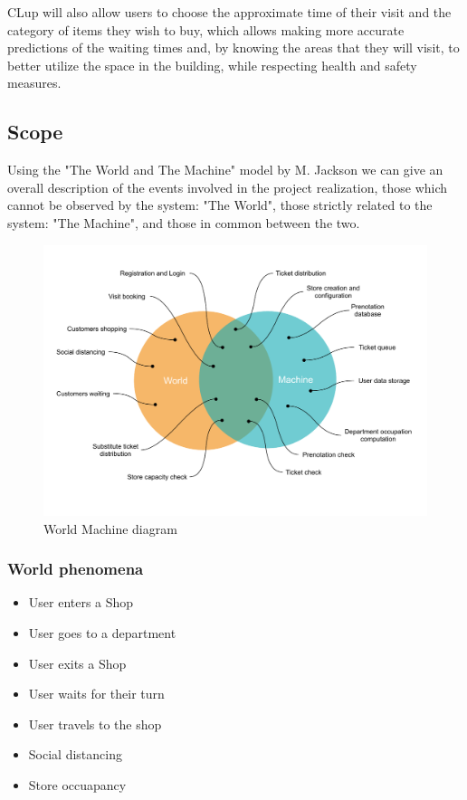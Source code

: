 CLup will also allow users to choose the approximate time of their visit and the category of items they wish to buy, which allows making more accurate predictions of the waiting times and, by knowing the areas that they will visit, to better utilize the space in the building, while respecting health and safety measures.

\subsection{Scope}

Using the "The World and The Machine" model by M. Jackson we can give an overall description of the events involved in the project realization, those which cannot be observed by the system: "The World", those strictly related to the system: "The Machine", and those in common between the two.

\begin{figure}[h]
    \centering
    \includegraphics[width=.85\textwidth]{Images/world-machine.pdf}
    \caption{\label{fig:world_machine} World Machine diagram }
\end{figure}

\subsubsection{World phenomena}
\begin{itemize}
    \item User enters a Shop
    \item User goes to a department
    \item User exits a Shop
    \item User waits for their turn
    \item User travels to the shop
    \item Social distancing
    \item Store occuapancy
\end{itemize}

